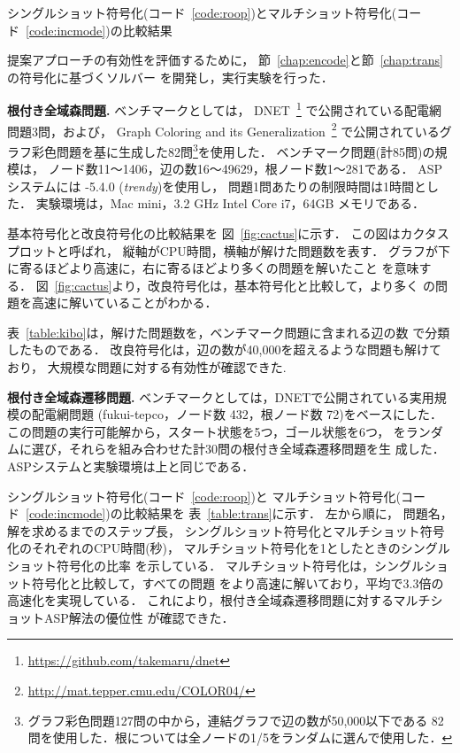 \begin{table}[t]
  \centering
  \caption{シングルショット符号化(コード~\ref{code:roop})とマルチショット符号化(コード~\ref{code:incmode})の比較結果}
  \label{table:trans}
  
\end{table}

提案アプローチの有効性を評価するために，
節~\ref{chap:encode}と節~\ref{chap:trans}の符号化に基づくソルバー
を開発し，実行実験を行った．

\textbf{根付き全域森問題.}
ベンチマークとしては，
DNET~\footnote{\url{https://github.com/takemaru/dnet}}
で公開されている配電網問題3問，および，
Graph Coloring and its Generalization~\footnote{\url{http://mat.tepper.cmu.edu/COLOR04/}}
で公開されているグラフ彩色問題を基に生成した82問\footnote{%
グラフ彩色問題127問の中から，連結グラフで辺の数が50,000以下である
82問を使用した．根については全ノードの1/5をランダムに選んで使用した．
}を使用した．
ベンチマーク問題(計85問)の規模は，
ノード数11〜1406，辺の数16〜49629，根ノード数1〜281である．
%
ASPシステムには {\clingo}-5.4.0 (\textit{trendy})を使用し，
問題1問あたりの制限時間は1時間とした．
実験環境は，Mac mini，3.2 GHz Intel Core i7，64GB メモリである．

基本符号化と改良符号化の比較結果を
図~\ref{fig:cactus}に示す．
この図はカクタスプロットと呼ばれ，
縦軸がCPU時間，横軸が解けた問題数を表す．
グラフが下に寄るほどより高速に，右に寄るほどより多くの問題を解いたこと
を意味する．
図~\ref{fig:cactus}より，改良符号化は，基本符号化と比較して，より多く
の問題を高速に解いていることがわかる．

表~\ref{table:kibo}は，解けた問題数を，ベンチマーク問題に含まれる辺の数
で分類したものである．
改良符号化は，辺の数が40,000を超えるような問題も解けており，
大規模な問題に対する有効性が確認できた. 

\textbf{根付き全域森遷移問題.}
ベンチマークとしては，DNETで公開されている実用規模の配電網問題
({\sf fukui-tepco}，ノード数 432，根ノード数 72)をベースにした．
この問題の実行可能解から，スタート状態を5つ，ゴール状態を6つ，
をランダムに選び，それらを組み合わせた計30問の根付き全域森遷移問題を生
成した．ASPシステムと実験環境は上と同じである．

シングルショット符号化(コード~\ref{code:roop})と
マルチショット符号化(コード~\ref{code:incmode})の比較結果を
表~\ref{table:trans}に示す．
左から順に，
問題名，
解を求めるまでのステップ長，
シングルショット符号化とマルチショット符号化のそれぞれのCPU時間(秒)，
マルチショット符号化を1としたときのシングルショット符号化の比率
を示している．
マルチショット符号化は，シングルショット符号化と比較して，すべての問題
をより高速に解いており，平均で3.3倍の高速化を実現している．
これにより，根付き全域森遷移問題に対するマルチショットASP解法の優位性
が確認できた．

